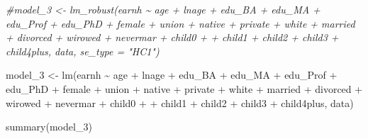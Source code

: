 \documentclass[
]{article}
\newenvironment{Shaded}{\begin{snugshade}}{\end{snugshade}}
\newcommand{\CommentTok}[1]{\textcolor[rgb]{0.56,0.35,0.01}{\textit{#1}}}
\newcommand{\FunctionTok}[1]{\textcolor[rgb]{0.00,0.00,0.00}{#1}}
\newcommand{\NormalTok}[1]{#1}
\newcommand{\OtherTok}[1]{\textcolor[rgb]{0.56,0.35,0.01}{#1}}
\newcommand{\SpecialCharTok}[1]{\textcolor[rgb]{0.00,0.00,0.00}{#1}}
\begin{document}
\begin{Shaded}
\begin{Highlighting}[]
\CommentTok{\#model\_3 \textless{}{-} lm\_robust(earnh  \textasciitilde{} age  + lnage + edu\_BA + edu\_MA + edu\_Prof + edu\_PhD + female + union + native + private + white + married + divorced + wirowed + nevermar + child0 + + child1 + child2 + child3 + child4plus, data, se\_type = "HC1")}

\NormalTok{model\_3 }\OtherTok{\textless{}{-}} \FunctionTok{lm}\NormalTok{(earnh  }\SpecialCharTok{\textasciitilde{}}\NormalTok{ age  }\SpecialCharTok{+}\NormalTok{ lnage }\SpecialCharTok{+}\NormalTok{ edu\_BA }\SpecialCharTok{+}\NormalTok{ edu\_MA }\SpecialCharTok{+}\NormalTok{ edu\_Prof }\SpecialCharTok{+}\NormalTok{ edu\_PhD }\SpecialCharTok{+}\NormalTok{ female }\SpecialCharTok{+}\NormalTok{ union }\SpecialCharTok{+}\NormalTok{ native }\SpecialCharTok{+}\NormalTok{ private }\SpecialCharTok{+}\NormalTok{ white }\SpecialCharTok{+}\NormalTok{ married }\SpecialCharTok{+}\NormalTok{ divorced }\SpecialCharTok{+}\NormalTok{ wirowed }\SpecialCharTok{+}\NormalTok{ nevermar }\SpecialCharTok{+}\NormalTok{ child0 }\SpecialCharTok{+} \SpecialCharTok{+}\NormalTok{ child1 }\SpecialCharTok{+}\NormalTok{ child2 }\SpecialCharTok{+}\NormalTok{ child3 }\SpecialCharTok{+}\NormalTok{ child4plus, data)}

\FunctionTok{summary}\NormalTok{(model\_3)}
\end{Highlighting}
\end{Shaded}
\end{document}
